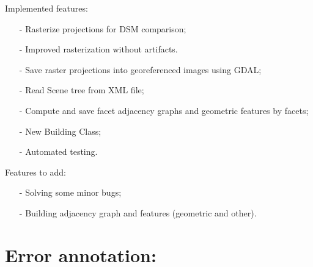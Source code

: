 \documentclass[9pt]{beamer}
\begin{document}
	\begin{frame}{Implemented features:}
		\begin{itemize}
			\item[-] Rasterize projections for DSM comparison;
			\item[-] Improved rasterization without artifacts.
			\item[-] Save raster projections into georeferenced images using GDAL;
			\item[-] Read Scene tree from XML file;
			\item[-] Compute and save facet adjacency graphs and geometric features by facets;
			\item[-] New Building Class;
			\item[-] Automated testing.
		\end{itemize}
	\end{frame}
	
	\begin{frame}{Features to add:}
		\begin{itemize}
			\item[-] Solving some minor bugs;
			\item[-] Building adjacency graph and features (geometric and other).
		\end{itemize}
	\end{frame}

	\section[Annotation]{Error annotation:}
\end{document}
